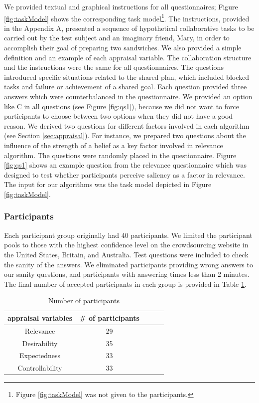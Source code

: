 \documentclass[12pt]{report}
\begin{document}
We provided textual and graphical instructions for all questionnaires; Figure
\ref{fig:taskModel} shows the corresponding task
model\footnote{Figure \ref{fig:taskModel} was not given to the
participants.}. The instructions, provided in the Appendix A, presented a
sequence of hypothetical collaborative tasks to be carried out by the test
subject and an imaginary friend, Mary, in order to accomplish their goal of
preparing two sandwiches. We also provided a simple definition and an example of
each appraisal variable. The collaboration structure and the instructions were
the same for all questionnaires. The questions introduced specific situations
related to the shared plan, which included blocked tasks and failure or
achievement of a shared goal. Each question provided three answers which were
counterbalanced in the questionnaire. We provided an option like C in all
questions (see Figure \ref{fig:qs1}), because we did not want to force
participants to choose between two options when they did not have a good reason.
We derived two questions for different factors involved in each algorithm (see
Section \ref{sec:appraisal}). For instance, we prepared two questions about the
influence of the strength of a belief as a key factor involved in relevance
algorithm. The questions were randomly placed in the questionnaire. Figure
\ref{fig:qs1} shows an example question from the relevance questionnaire which
was designed to test whether participants perceive saliency as a factor in
relevance. The input for our algorithms was the task model depicted in Figure
\ref{fig:taskModel}.

\subsubsection{Participants}
Each participant group originally had 40 participants. We limited the
participant pools to those with the highest confidence level on the
crowdsourcing website in the United States, Britain, and Australia. Test
questions were included to check the sanity of the answers. We eliminated
participants providing wrong answers to our sanity questions, and participants
with answering times less than 2 minutes. The final number of accepted
participants in each group is provided in Table \ref{tbl:statistics}.

\begin{table}[t]
\centering
\caption{Number of participants}
\begin{tabular}{|c|c|c|c|c|} \hline
appraisal variables & \# of participants\\ \hline 
Relevance &  29\\ \hline
Desirability & 35\\ \hline 
Expectedness & 33\\ \hline 
Controllability & 33\\ \hline
\end{tabular}
\label{tbl:statistics}
\end{table}
\end{document}
